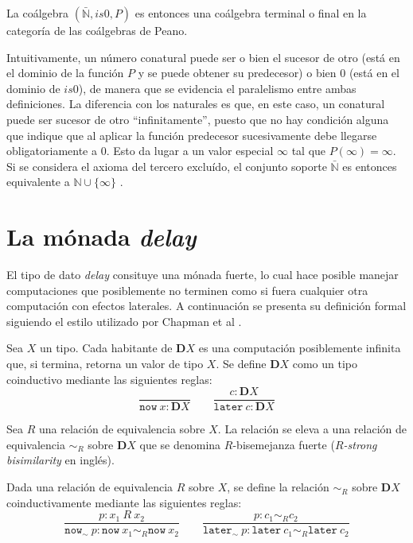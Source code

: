 La coálgebra $(\bar{\mathbb{N}},is0,P)$ es entonces una coálgebra terminal o final en la categoría de las coálgebras de Peano.  

Intuitivamente, un número conatural puede ser o bien el sucesor de otro (está en el dominio de la función $P$ y se puede obtener su predecesor) o bien $0$ (está en el dominio de $is0$), de manera que se evidencia el paralelismo entre ambas definiciones. La diferencia con los naturales es que, en este caso, un conatural puede ser sucesor de otro ``infinitamente'', puesto que no hay condición alguna que indique que al aplicar la función predecesor sucesivamente debe llegarse obligatoriamente a $0$. Esto da lugar a un valor especial $\infty$ tal que $P(\infty) = \infty$. Si se considera el axioma del tercero excluído, el conjunto soporte $\bar{\mathbb{N}}$ es entonces equivalente a $\mathbb{N} \cup \{\infty\}$ \cite{goncharov:2021}. 


\section{La mónada \textit{delay}}\label{delay:delay}

El tipo de dato \textit{delay} consituye una mónada fuerte, lo cual hace posible manejar computaciones que posiblemente no terminen como si fuera cualquier otra computación con efectos laterales. A continuación se presenta su definición formal siguiendo el estilo utilizado por Chapman et al \cite{chapman:2019}. 

\begin{definition}
Sea $X$ un tipo. Cada habitante de $\mathbf{D} X$ es una computación posiblemente infinita que, si termina, retorna un valor de tipo $X$. Se define $\mathbf{D} X$ como un tipo coinductivo mediante las siguientes reglas:
\begin{equation*}
\dfrac{}{\mathtt{now} \ x : \mathbf{D} X} 	\qquad  	\dfrac{c : \mathbf{D} X}{\mathtt{later} \ c : \mathbf{D} X}
\end{equation*}
\end{definition}

Sea $R$ una relación de equivalencia sobre $X$. La relación se eleva a una relación de equivalencia $\sim_R$ sobre $\mathbf{D}X$ que se denomina $R$-bisemejanza fuerte (\textit{$R$-strong bisimilarity} en inglés). 

\begin{definition}
Dada una relación de equivalencia $R$ sobre $X$, se define la relación $\sim_R$ sobre $\mathbf{D}X$ coinductivamente mediante las siguientes reglas:
\begin{equation*}
\dfrac{p : x_1 \ R \ x_2}{\mathtt{now}_{\sim} \ p : \mathtt{now} \ x_1 \sim_R \mathtt{now} \ x_2}  	\qquad  	\dfrac{p : c_1 \sim_R c_2}{\mathtt{later}_{\sim} \ p : \mathtt{later} \ c_1 \sim_R \mathtt{later} \ c_2}
\end{equation*}
\end{definition}

